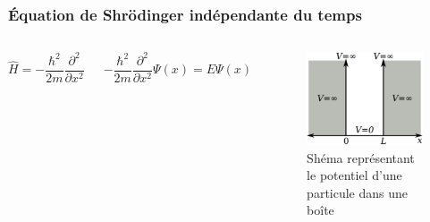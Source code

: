 \documentclass{beamer}
\begin{document}
\begin{frame}
\frametitle{Équation de Shrödinger indépendante du temps}

\begin{columns}

\begin{equation}\tag{3}
\hat{H}=-\frac{\hbar^2}{2m}\frac{\partial^2}{\partial x^2}
\end{equation} 

\begin{equation}\tag{4}
-\frac{\hbar^2}{2m}\frac{\partial^2}{\partial x^2}\Psi(x)=E\Psi(x)
\end{equation} 

\begin{figure}
\includegraphics[scale=0.4]{Pot}
\caption{Shéma représentant le potentiel d'une particule dans une boîte}
\end{figure}
\end{columns}

\end{frame}
\end{document}
